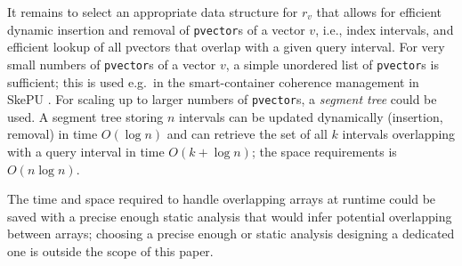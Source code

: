 \documentclass[preprint,12pt]{elsarticle}
\newcommand{\TODO}[1]{\textcolor{red}{\textbf{[TODO:#1]}}}
\begin{document}

It remains to select an appropriate data structure for $r_v$ that allows for
efficient dynamic insertion and removal of \texttt{pvector}s of a vector $v$, 
i.e., index intervals, and efficient lookup of all pvectors that overlap
with a given query interval.
For very small numbers of \texttt{pvector}s of a vector $v$, a simple unordered
list of \texttt{pvector}s is sufficient; this is used e.g.\ in the
smart-container coherence management in SkePU \cite{Dastgeer-IJPP15}. 
For scaling up to larger numbers of \texttt{pvector}s,
a \emph{segment tree} \cite[Sec.~10.3]{Overmars} %
could be used. A segment tree storing $n$ intervals
can be updated dynamically (insertion, removal) in time  $O(\log n)$ and
can retrieve the set of all $k$ intervals overlapping with a query interval
in time $O(k+\log n)$; the space requirements is $O(n\log n)$.

The time and space required to handle overlapping arrays at runtime could be saved with a precise enough static analysis that would infer potential overlapping between arrays; choosing a precise enough or static analysis designing a dedicated one is outside the scope of this paper.

%
%
\end{document}
